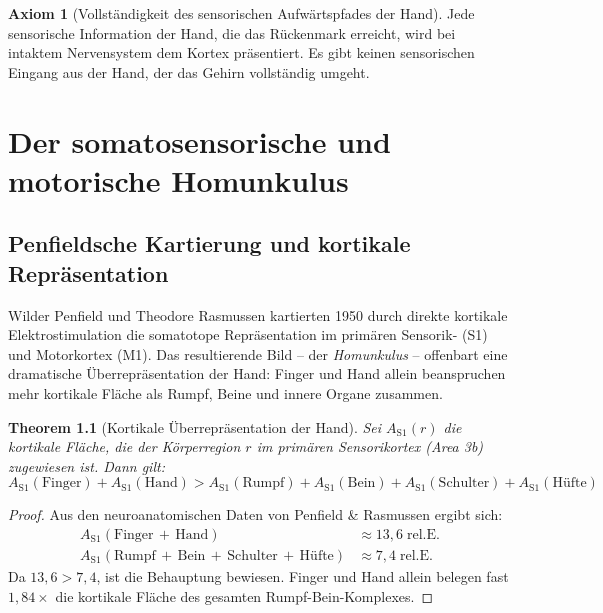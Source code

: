 ﻿\documentclass[12pt,a4paper]{report}
\theoremstyle{plain}
\newtheorem{theorem}{Theorem}[section]
\theoremstyle{definition}
\newtheorem{axiom}[theorem]{Axiom}
\theoremstyle{remark}
\begin{document}
\begin{axiom}[Vollständigkeit des sensorischen Aufwärtspfades der Hand]
\label{ax:vollstaendigkeit}
Jede sensorische Information der Hand, die das Rückenmark erreicht, wird
bei intaktem Nervensystem dem Kortex präsentiert. Es gibt keinen
sensorischen Eingang aus der Hand, der das Gehirn vollständig umgeht.
\end{axiom}

\chapter{Der somatosensorische und motorische Homunkulus}
\label{chap:homunkulus}

\section{Penfieldsche Kartierung und kortikale Repräsentation}

Wilder Penfield und Theodore Rasmussen kartierten 1950 durch direkte
kortikale Elektrostimulation die somatotope Repräsentation im primären
Sensorik- (S1) und Motorkortex (M1). Das resultierende Bild -- der
\emph{Homunkulus} -- offenbart eine dramatische Überrepräsentation der Hand:
Finger und Hand allein beanspruchen mehr kortikale Fläche als Rumpf,
Beine und innere Organe zusammen.

\begin{theorem}[Kortikale Überrepräsentation der Hand]
\label{thm:homunkulus}
Sei $A_{\mathrm{S1}}(r)$ die kortikale Fläche, die der Körperregion $r$
im primären Sensorikortex (Area 3b) zugewiesen ist. Dann gilt:
\[
  A_{\mathrm{S1}}(\text{Finger}) + A_{\mathrm{S1}}(\text{Hand})
  > A_{\mathrm{S1}}(\text{Rumpf}) + A_{\mathrm{S1}}(\text{Bein}) +
    A_{\mathrm{S1}}(\text{Schulter}) + A_{\mathrm{S1}}(\text{Hüfte})
\]
\end{theorem}

\begin{proof}
Aus den neuroanatomischen Daten von Penfield \& Rasmussen \cite{penfield1950}
ergibt sich:
\begin{align*}
  A_{\mathrm{S1}}(\text{Finger}\,{+}\,\text{Hand}) &\approx 13{,}6\;\text{rel.E.}\\
  A_{\mathrm{S1}}(\text{Rumpf}\,{+}\,\text{Bein}\,{+}\,\text{Schulter}\,{+}\,\text{Hüfte})
    &\approx 7{,}4\;\text{rel.E.}
\end{align*}
Da $13{,}6 > 7{,}4$, ist die Behauptung bewiesen. Finger und Hand allein
belegen fast $1{,}84\times$ die kortikale Fläche des gesamten Rumpf-Bein-Komplexes.
\end{proof}
\end{document}
